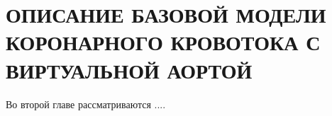 \chapter{\MakeUppercase{Описание базовой модели коронарного кровотока с виртуальной аортой}}
\label{ch:chap2}

Во второй главе рассматриваются ....







